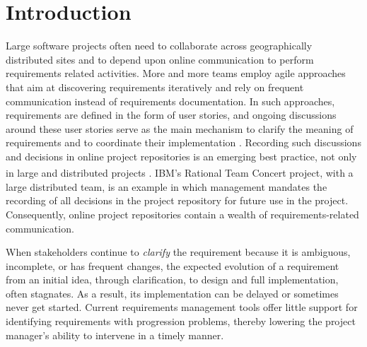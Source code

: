 \section{Introduction}

Large software projects often  need to collaborate across geographically distributed sites and to depend upon online communication to perform requirements related activities. 
More and more teams employ agile approaches that aim at discovering requirements iteratively and rely on frequent communication instead of requirements documentation. 
In such approaches, requirements are defined in the form of user stories, and ongoing discussions around these user stories serve as the main mechanism to clarify the meaning of requirements and to coordinate their implementation \cite{Cao2008}. 
Recording such discussions and decisions in online project repositories is an emerging best practice, not only in large and distributed projects \cite{Aranda2007}.
IBM\textsuperscript{\textregistered}'s Rational Team Concert\textsuperscript{\textregistered} project, with a large distributed team, is an example in which management mandates the recording of all decisions in the project repository for future use in the project\cite{Frost2007}. 
Consequently, online project repositories contain a wealth of requirements-related communication.

When stakeholders continue to \emph{clarify} the requirement because it is ambiguous, incomplete, or has frequent changes, the expected evolution of a requirement from an initial idea, through clarification, to design and full implementation, often stagnates. 
As a result, its implementation can be delayed or sometimes never get started. 
Current requirements management tools offer little support for identifying requirements with progression problems, thereby lowering the project manager's  ability to intervene in a timely manner.

